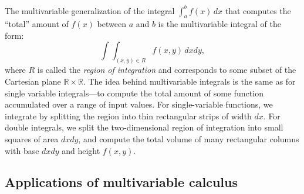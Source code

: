 		The multivariable generalization of the integral $\int_a^b f(x) \, dx$
		that computes the ``total'' amount of $f(x)$ between $a$ and $b$
		is the multivariable integral of the form:
		\[
			\int \! \int_{(x,y) \in R} f(x,y) \, dxdy,
		\]
		where $R$ is called the \emph{region of integration}
		and corresponds to some subset of the Cartesian plane $\mathbb{R} \times \mathbb{R}$.
		The idea behind multivariable integrals is the same as for single variable integrals---to
		compute the total amount of some function accumulated over a range of input values.
		For single-variable functions,
		we integrate by splitting the region into thin rectangular strips of width $dx$.
		For double integrals,
		we split the two-dimensional region of integration into small squares of area $dxdy$,
		and compute the total volume of many rectangular columns
		with base $dxdy$ and height $f(x,y)$.






	\subsection{Applications of multivariable calculus}

